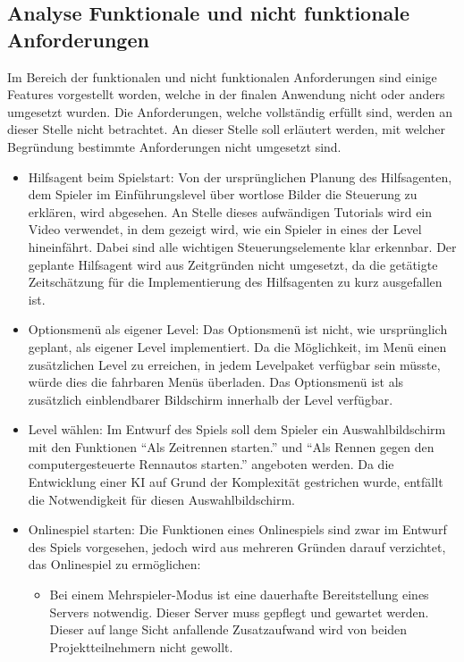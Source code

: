 \subsection{Analyse Funktionale und nicht funktionale Anforderungen}
Im Bereich der funktionalen und nicht funktionalen Anforderungen sind einige Features vorgestellt worden, welche in der finalen Anwendung nicht oder anders umgesetzt wurden. Die Anforderungen, welche vollständig erfüllt sind, werden an dieser Stelle nicht betrachtet. An dieser Stelle soll erläutert werden, mit welcher Begründung bestimmte Anforderungen nicht umgesetzt sind.
\begin{itemize}
    \item{Hilfsagent beim Spielstart: Von der ursprünglichen Planung des Hilfsagenten, dem Spieler im Einführungslevel über wortlose Bilder die Steuerung zu erklären, wird abgesehen. An Stelle dieses aufwändigen Tutorials wird ein Video verwendet, in dem gezeigt wird, wie ein Spieler in eines der Level hineinfährt. Dabei sind alle wichtigen Steuerungselemente klar erkennbar. Der geplante Hilfsagent wird aus Zeitgründen nicht umgesetzt, da die getätigte Zeitschätzung für die Implementierung des Hilfsagenten zu kurz ausgefallen ist.}
    \item{Optionsmenü als eigener Level: Das Optionsmenü ist nicht, wie ursprünglich geplant, als eigener Level implementiert. Da die Möglichkeit, im Menü einen zusätzlichen Level zu erreichen, in jedem Levelpaket verfügbar sein müsste, würde dies die fahrbaren Menüs überladen. Das Optionsmenü ist als zusätzlich einblendbarer Bildschirm innerhalb der Level verfügbar.}
    \item{Level wählen: Im Entwurf des Spiels soll dem Spieler ein Auswahlbildschirm mit den Funktionen \enquote{Als Zeitrennen starten.} und \enquote{Als Rennen gegen den computergesteuerte Rennautos starten.} angeboten werden. Da die Entwicklung einer KI auf Grund der Komplexität gestrichen wurde, entfällt die Notwendigkeit für diesen Auswahlbildschirm.}
    \item{Onlinespiel starten: Die Funktionen eines Onlinespiels sind zwar im Entwurf des Spiels vorgesehen, jedoch wird aus mehreren Gründen darauf verzichtet, das Onlinespiel zu ermöglichen:}
    \begin{itemize}
        \item{Bei einem Mehrspieler-Modus ist eine dauerhafte Bereitstellung eines Servers notwendig. Dieser Server muss gepflegt und gewartet werden. Dieser auf lange Sicht anfallende Zusatzaufwand wird von beiden Projektteilnehmern nicht gewollt.}

\end{itemize}
\end{itemize}
